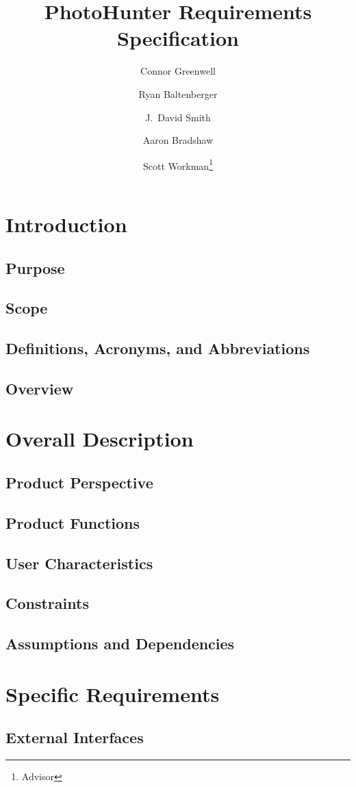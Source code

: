 \documentclass{article}
\title{PhotoHunter Requirements Specification
}
\author{Connor Greenwell \and Ryan Baltenberger 
  \and J.\ David Smith \and Aaron Bradshaw
  \and Scott Workman\footnote{Advisor}}
\begin{document}
\maketitle

\section{Introduction}
\subsection{Purpose}
\subsection{Scope}
\subsection{Definitions, Acronyms, and Abbreviations}
\subsection{Overview}

\section{Overall Description}
\subsection{Product Perspective}
\subsection{Product Functions}
\subsection{User Characteristics}
\subsection{Constraints}
\subsection{Assumptions and Dependencies}

\section{Specific Requirements}
\subsection{External Interfaces}
\end{document}
